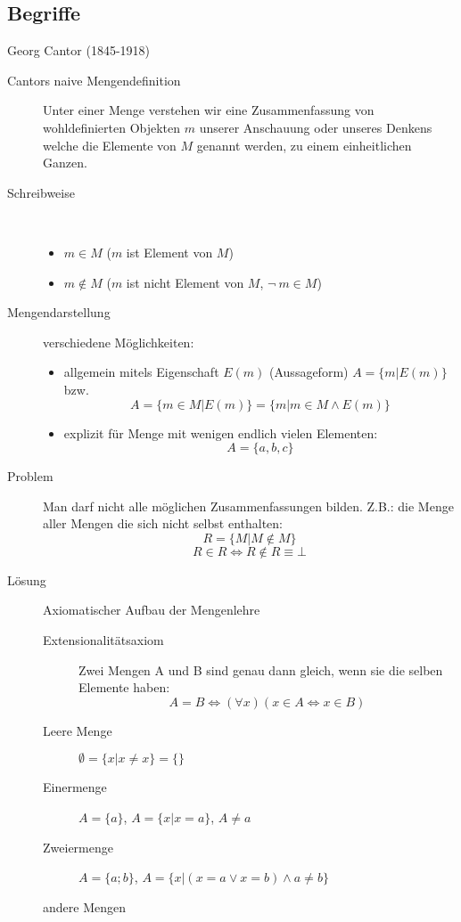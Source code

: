 \documentclass[12pt,a4paper]{article}
\begin{document}
\subsection{Begriffe}
Georg Cantor (1845-1918)
	\begin{description}
		\item[Cantors naive Mengendefinition] Unter einer Menge verstehen wir eine Zusammenfassung von wohldefinierten Objekten $m$ unserer Anschauung oder unseres Denkens welche die Elemente von $M$ genannt werden, zu einem einheitlichen Ganzen.
		\item[Schreibweise]\ 
			\begin{itemize}
				\item $m \in M$ ($m$ ist Element von $M$)
				\item $m \not\in M$ ($m$ ist nicht Element von $M$, $\neg\ m \in M$)
			\end{itemize}
		\item[Mengendarstellung] verschiedene Möglichkeiten:
			\begin{itemize}
				\item allgemein mitels Eigenschaft $E(m)$ (Aussageform) $A=\lbrace m|E(m) \rbrace$ bzw.
					$$A = \lbrace m \in M | E(m) \rbrace = \lbrace m | m \in M \wedge E(m) \rbrace$$
				\item explizit für Menge mit wenigen endlich vielen Elementen:
					 $$A=\lbrace a, b, c\rbrace$$
			\end{itemize}
		\item[Problem] Man darf nicht alle möglichen Zusammenfassungen bilden. Z.B.: die Menge aller Mengen die sich nicht selbst enthalten:
			$$R=\lbrace M | M \not \in M \rbrace$$
			$$R \in R \Leftrightarrow R \not \in R \equiv \bot$$
		\item[Lösung] Axiomatischer Aufbau der Mengenlehre
			\begin{description}
				\item[Extensionalitätsaxiom] Zwei Mengen A und B sind genau dann gleich, wenn sie die selben Elemente haben:
					$$A = B \Leftrightarrow (\forall x)(x \in A \Leftrightarrow x \in B)$$
				\item[Leere Menge] $\emptyset = \lbrace x | x \not = x\rbrace = \lbrace\rbrace$
				\item[Einermenge] $A=\lbrace a \rbrace$, $A = \lbrace x | x = a \rbrace$, $A \not = a$
				\item[Zweiermenge] $A=\lbrace a; b \rbrace$, $A = \lbrace x|(x=a \vee x=b) \wedge a \not = b \rbrace$
				\item[andere Mengen] \ 

\end{description}
\end{description}
\end{document}
